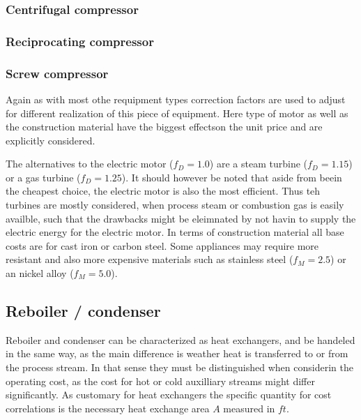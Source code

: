 			\subsubsection{Centrifugal compressor}
			
			\subsubsection{Reciprocating compressor}
				
			\subsubsection{Screw compressor}
		
		Again as with most othe requipment types correction factors are used to adjust for different realization 
		of this piece of equipment. Here type of motor as well as the construction material have the biggest 
		effectson the unit price and are explicitly considered. 
		
		The alternatives to the electric motor ($f_D = 1.0$) are a steam turbine ($f_D = 1.15$) or a gas turbine
		($f_D = 1.25$). It should however be noted that aside from beein the cheapest choice, the electric motor
		is also the most efficient. Thus teh turbines are mostly considered, when process steam or combustion gas 
		is easily availble, such that the drawbacks might be eleimnated by not havin to supply the electric 
		energy for the electric motor. In terms of construction material all base costs are for cast iron or
		carbon steel. Some appliances may require more resistant and also more expensive materials such as
		stainless steel ($f_M = 2.5$) or an nickel alloy ($f_M = 5.0$).   
		
	\subsection{Reboiler / condenser}
		Reboiler and condenser can be characterized as heat exchangers, and be handeled in the same way, 
		as the main difference is weather heat is transferred to or from the process stream. In that sense 
		they must be distinguished when considerin the operating cost, as the cost for hot or cold 
		auxilliary streams might differ significantly. As customary for heat exchangers the specific 
		quantity for cost correlations is the necessary heat exchange area $A$ measured in $ft$. 
		
